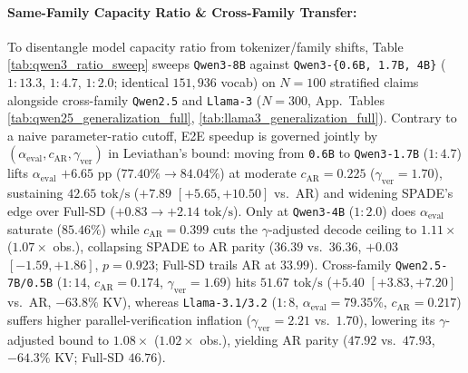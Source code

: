 \documentclass[11pt]{article}
\begin{document}
\paragraph{Same-Family Capacity Ratio \& Cross-Family Transfer:}
To disentangle model capacity ratio from tokenizer/family shifts, Table \ref{tab:qwen3_ratio_sweep} sweeps \texttt{Qwen3-8B} against \texttt{Qwen3-\{0.6B, 1.7B, 4B\}} ($1:13.3$, $1:4.7$, $1:2.0$; identical $151,936$ vocab) on $N=100$ stratified claims alongside cross-family \texttt{Qwen2.5} and \texttt{Llama-3} ($N=300$, App.\ Tables \ref{tab:qwen25_generalization_full}, \ref{tab:llama3_generalization_full}). Contrary to a naive parameter-ratio cutoff, E2E speedup is governed jointly by $(\alpha_{\text{eval}}, c_{\text{AR}}, \gamma_{\text{ver}})$ in Leviathan's bound: moving from \texttt{0.6B} to \texttt{Qwen3-1.7B} ($1:4.7$) lifts $\alpha_{\text{eval}}$ $+6.65\text{ pp}$ ($77.40\% \to 84.04\%$) at moderate $c_{\text{AR}}=0.225$ ($\gamma_{\text{ver}}=1.70$), sustaining $42.65\text{ tok/s}$ ($+7.89$ $[+5.65, +10.50]$ vs.\ AR) and widening SPADE's edge over Full-SD ($+0.83 \to +2.14\text{ tok/s}$). Only at \texttt{Qwen3-4B} ($1:2.0$) does $\alpha_{\text{eval}}$ saturate ($85.46\%$) while $c_{\text{AR}}=0.399$ cuts the $\gamma$-adjusted decode ceiling to $1.11\times$ ($1.07\times$ obs.), collapsing SPADE to AR parity ($36.39$ vs.\ $36.36$, $+0.03$ $[-1.59, +1.86]$, $p=0.923$; Full-SD trails AR at $33.99$). Cross-family \texttt{Qwen2.5-7B/0.5B} ($1:14$, $c_{\text{AR}}=0.174$, $\gamma_{\text{ver}}=1.69$) hits $51.67\text{ tok/s}$ ($+5.40$ $[+3.83, +7.20]$ vs.\ AR, $-63.8\%$ KV), whereas \texttt{Llama-3.1/3.2} ($1:8$, $\alpha_{\text{eval}}=79.35\%$, $c_{\text{AR}}=0.217$) suffers higher parallel-verification inflation ($\gamma_{\text{ver}}=2.21$ vs.\ $1.70$), lowering its $\gamma$-adjusted bound to $1.08\times$ ($1.02\times$ obs.), yielding AR parity ($47.92$ vs.\ $47.93$, $-64.3\%$ KV; Full-SD $46.76$).
\end{document}
